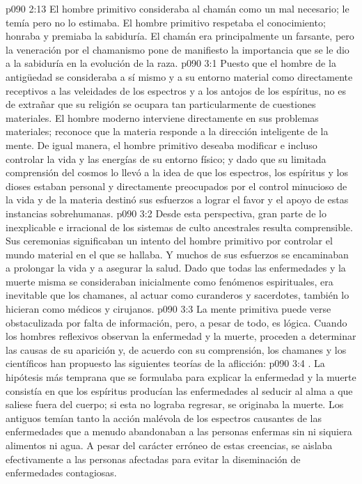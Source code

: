 \vs p090 2:13 El hombre primitivo consideraba al chamán como un mal necesario; le temía pero no lo estimaba. El hombre primitivo respetaba el conocimiento; honraba y premiaba la sabiduría. El chamán era principalmente un farsante, pero la veneración por el chamanismo pone de manifiesto la importancia que se le dio a la sabiduría en la evolución de la raza.
\vs p090 3:1 Puesto que el hombre de la antigüedad se consideraba a sí mismo y a su entorno material como directamente receptivos a las veleidades de los espectros y a los antojos de los espíritus, no es de extrañar que su religión se ocupara tan particularmente de cuestiones materiales. El hombre moderno interviene directamente en sus problemas materiales; reconoce que la materia responde a la dirección inteligente de la mente. De igual manera, el hombre primitivo deseaba modificar e incluso controlar la vida y las energías de su entorno físico; y dado que su limitada comprensión del cosmos lo llevó a la idea de que los espectros, los espíritus y los dioses estaban personal y directamente preocupados por el control minucioso de la vida y de la materia destinó sus esfuerzos a lograr el favor y el apoyo de estas instancias sobrehumanas.
\vs p090 3:2 Desde esta perspectiva, gran parte de lo inexplicable e irracional de los sistemas de culto ancestrales resulta comprensible. Sus ceremonias significaban un intento del hombre primitivo por controlar el mundo material en el que se hallaba. Y muchos de sus esfuerzos se encaminaban a prolongar la vida y a asegurar la salud. Dado que todas las enfermedades y la muerte misma se consideraban inicialmente como fenómenos espirituales, era inevitable que los chamanes, al actuar como curanderos y sacerdotes, también lo hicieran como médicos y cirujanos.
\vs p090 3:3 La mente primitiva puede verse obstaculizada por falta de información, pero, a pesar de todo, es lógica. Cuando los hombres reflexivos observan la enfermedad y la muerte, proceden a determinar las causas de su aparición y, de acuerdo con su comprensión, los chamanes y los científicos han propuesto las siguientes teorías de la aflicción:
\vs p090 3:4 . La hipótesis más temprana que se formulaba para explicar la enfermedad y la muerte consistía en que los espíritus producían las enfermedades al seducir al alma a que saliese fuera del cuerpo; si esta no lograba regresar, se originaba la muerte. Los antiguos temían tanto la acción malévola de los espectros causantes de las enfermedades que a menudo abandonaban a las personas enfermas sin ni siquiera alimentos ni agua. A pesar del carácter erróneo de estas creencias, se aislaba efectivamente a las personas afectadas para evitar la diseminación de enfermedades contagiosas.
